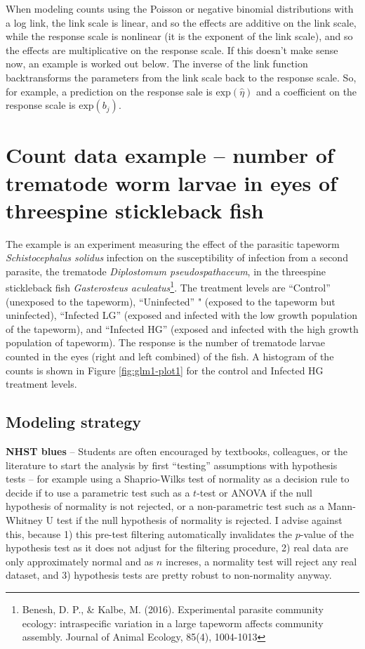 \documentclass[]{book}
\let\rmarkdownfootnote\footnote%
\def\footnote{\protect\rmarkdownfootnote}
\begin{document}
When modeling counts using the Poisson or negative binomial
distributions with a log link, the link scale is linear, and so the
effects are additive on the link scale, while the response scale is
nonlinear (it is the exponent of the link scale), and so the effects are
multiplicative on the response scale. If this doesn't make sense now, an
example is worked out below. The inverse of the link function
backtransforms the parameters from the link scale back to the response
scale. So, for example, a prediction on the response sale is
\(\mathrm{exp}(\hat{\eta})\) and a coefficient on the response scale is
\(\mathrm{exp}(b_j)\).

\section{Count data example -- number of trematode worm larvae in eyes
of threespine stickleback
fish}\label{count-data-example-number-of-trematode-worm-larvae-in-eyes-of-threespine-stickleback-fish}

The example is an experiment measuring the effect of the parasitic
tapeworm \emph{Schistocephalus solidus} infection on the susceptibility
of infection from a second parasite, the trematode \emph{Diplostomum
pseudospathaceum}, in the threespine stickleback fish \emph{Gasterosteus
aculeatus}\footnote{Benesh, D. P., \& Kalbe, M. (2016). Experimental
  parasite community ecology: intraspecific variation in a large
  tapeworm affects community assembly. Journal of Animal Ecology, 85(4),
  1004-1013}. The treatment levels are ``Control'' (unexposed to the
tapeworm), ``Uninfected'' " (exposed to the tapeworm but uninfected),
``Infected LG'' (exposed and infected with the low growth population of
the tapeworm), and ``Infected HG'' (exposed and infected with the high
growth population of tapeworm). The response is the number of trematode
larvae counted in the eyes (right and left combined) of the fish. A
histogram of the counts is shown in Figure \ref{fig:glm1-plot1} for the
control and Infected HG treatment levels.

\subsection{Modeling strategy}\label{modeling-strategy-1}

\textbf{NHST blues} -- Students are often encouraged by textbooks,
colleagues, or the literature to start the analysis by first ``testing''
assumptions with hypothesis tests -- for example using a Shaprio-Wilks
test of normality as a decision rule to decide if to use a parametric
test such as a \(t\)-test or ANOVA if the null hypothesis of normality
is not rejected, or a non-parametric test such as a Mann-Whitney U test
if the null hypothesis of normality is rejected. I advise against this,
because 1) this pre-test filtering automatically invalidates the
\(p\)-value of the hypothesis test as it does not adjust for the
filtering procedure, 2) real data are only approximately normal and as
\(n\) increses, a normality test will reject any real dataset, and 3)
hypothesis tests are pretty robust to non-normality anyway.
\end{document}
